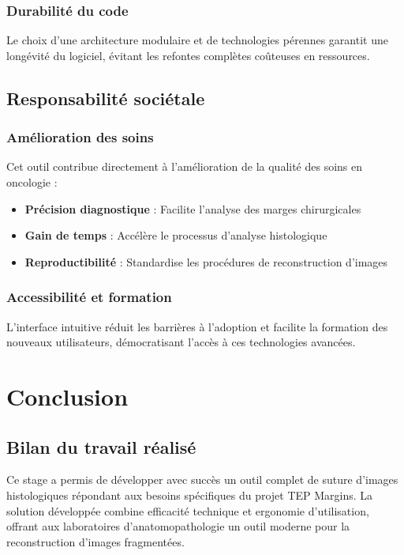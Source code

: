 \documentclass[11pt,a4paper]{report}
\begin{document}
\subsection{Durabilité du code}

Le choix d'une architecture modulaire et de technologies pérennes garantit une longévité du logiciel, évitant les refontes complètes coûteuses en ressources.

\section{Responsabilité sociétale}

\subsection{Amélioration des soins}

Cet outil contribue directement à l'amélioration de la qualité des soins en oncologie :

\begin{itemize}
\item \textbf{Précision diagnostique} : Facilite l'analyse des marges chirurgicales
\item \textbf{Gain de temps} : Accélère le processus d'analyse histologique
\item \textbf{Reproductibilité} : Standardise les procédures de reconstruction d'images
\end{itemize}

\subsection{Accessibilité et formation}

L'interface intuitive réduit les barrières à l'adoption et facilite la formation des nouveaux utilisateurs, démocratisant l'accès à ces technologies avancées.

\newpage

\chapter{Conclusion}

\section{Bilan du travail réalisé}

Ce stage a permis de développer avec succès un outil complet de suture d'images histologiques répondant aux besoins spécifiques du projet TEP Margins. La solution développée combine efficacité technique et ergonomie d'utilisation, offrant aux laboratoires d'anatomopathologie un outil moderne pour la reconstruction d'images fragmentées.
\end{document}
